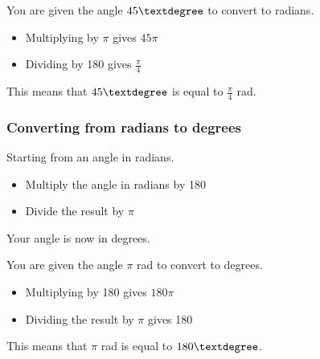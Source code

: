 \documentclass[
  12pt,
  a4paper, oneside]{starmastarticle}
\providecommand{\tightlist}{%
  \setlength{\itemsep}{0pt}\setlength{\parskip}{0pt}}\usepackage{longtable,booktabs,array}
\begin{document}
\begin{tcolorbox}[enhanced jigsaw, bottomrule=.15mm, rightrule=.15mm, breakable, left=2mm, colframe=quarto-callout-note-color-frame, arc=.35mm, toprule=.15mm, colback=white, leftrule=.75mm, opacityback=0]
\begin{minipage}[t]{5.5mm}
\textcolor{quarto-callout-note-color}{\faInfo}
\end{minipage}%
\begin{minipage}[t]{\textwidth - 5.5mm}
You are given the angle \(45\textdegree\) to convert to radians.

\begin{itemize}
\tightlist
\item
  Multiplying by \(\pi\) gives \(45\pi\)
\item
  Dividing by 180 gives \(\frac{\pi}{4}\)
\end{itemize}

This means that \(45\textdegree\) is equal to \(\frac{\pi}{4}\)
rad.\end{minipage}%
\end{tcolorbox}

\hypertarget{converting-from-radians-to-degrees}{%
\subsubsection{Converting from radians to
degrees}\label{converting-from-radians-to-degrees}}

Starting from an angle in radians.

\begin{itemize}
\tightlist
\item
  Multiply the angle in radians by 180
\item
  Divide the result by \(\pi\)
\end{itemize}

Your angle is now in degrees.

\begin{tcolorbox}[enhanced jigsaw, bottomrule=.15mm, rightrule=.15mm, breakable, left=2mm, colframe=quarto-callout-note-color-frame, arc=.35mm, toprule=.15mm, colback=white, leftrule=.75mm, opacityback=0]
\begin{minipage}[t]{5.5mm}
\textcolor{quarto-callout-note-color}{\faInfo}
\end{minipage}%
\begin{minipage}[t]{\textwidth - 5.5mm}
You are given the angle \(\pi\) rad to convert to degrees.

\begin{itemize}
\tightlist
\item
  Multiplying by 180 gives \(180\pi\)
\item
  Dividing the result by \(\pi\) gives 180
\end{itemize}

This means that \(\pi\) rad is equal to
\(180\textdegree\).\end{minipage}%
\end{tcolorbox}
\end{document}
